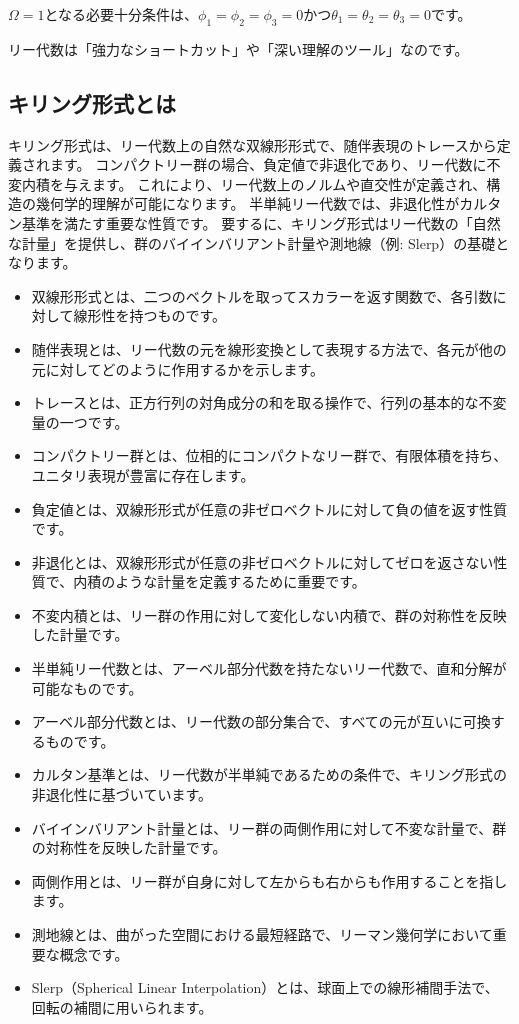 \documentclass[a4paper,12pt,notitlepage]{jsreport}
\begin{document}
$\Omega = 1 $となる必要十分条件は、$ \phi_1 = \phi_2 = \phi_3 = 0 $かつ$ \theta_1 = \theta_2 = \theta_3 = 0 $です。

リー代数は「強力なショートカット」や「深い理解のツール」なのです。

\subsection{キリング形式とは}

キリング形式は、リー代数上の自然な双線形形式で、随伴表現のトレースから定義されます。
コンパクトリー群の場合、負定値で非退化であり、リー代数に不変内積を与えます。
これにより、リー代数上のノルムや直交性が定義され、構造の幾何学的理解が可能になります。
半単純リー代数では、非退化性がカルタン基準を満たす重要な性質です。
要するに、キリング形式はリー代数の「自然な計量」を提供し、群のバイインバリアント計量や測地線（例: Slerp）の基礎となります。

\begin{itemize}
  \item 双線形形式とは、二つのベクトルを取ってスカラーを返す関数で、各引数に対して線形性を持つものです。
  \item 随伴表現とは、リー代数の元を線形変換として表現する方法で、各元が他の元に対してどのように作用するかを示します。
  \item トレースとは、正方行列の対角成分の和を取る操作で、行列の基本的な不変量の一つです。
  \item コンパクトリー群とは、位相的にコンパクトなリー群で、有限体積を持ち、ユニタリ表現が豊富に存在します。
  \item 負定値とは、双線形形式が任意の非ゼロベクトルに対して負の値を返す性質です。
  \item 非退化とは、双線形形式が任意の非ゼロベクトルに対してゼロを返さない性質で、内積のような計量を定義するために重要です。
  \item 不変内積とは、リー群の作用に対して変化しない内積で、群の対称性を反映した計量です。
  \item 半単純リー代数とは、アーベル部分代数を持たないリー代数で、直和分解が可能なものです。
  \item アーベル部分代数とは、リー代数の部分集合で、すべての元が互いに可換するものです。
  \item カルタン基準とは、リー代数が半単純であるための条件で、キリング形式の非退化性に基づいています。
  \item バイインバリアント計量とは、リー群の両側作用に対して不変な計量で、群の対称性を反映した計量です。
  \item 両側作用とは、リー群が自身に対して左からも右からも作用することを指します。
  \item 測地線とは、曲がった空間における最短経路で、リーマン幾何学において重要な概念です。
  \item Slerp（Spherical Linear Interpolation）とは、球面上での線形補間手法で、回転の補間に用いられます。
\end{itemize}
\end{document}
